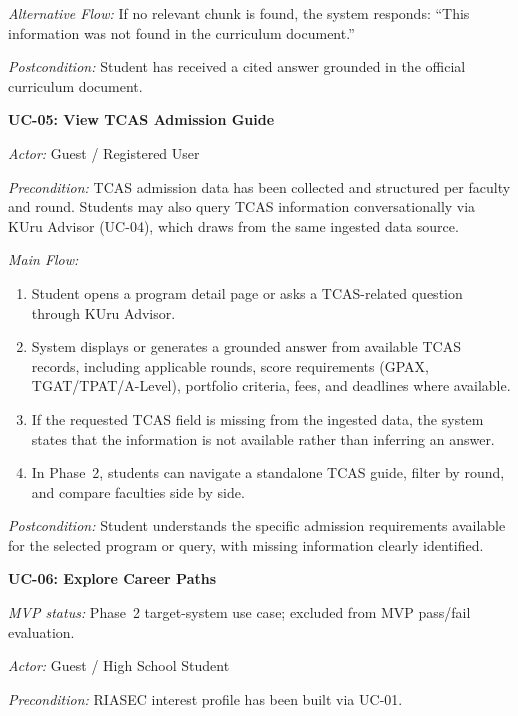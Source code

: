 \noindent\textit{Alternative Flow:} If no relevant chunk is found, the system responds: ``This information was not found in the curriculum document.''

\noindent\textit{Postcondition:} Student has received a cited answer grounded in the official curriculum document.

\vspace{1ex}
\noindent\textbf{UC-05: View TCAS Admission Guide}

\noindent\textit{Actor:} Guest / Registered User

\noindent\textit{Precondition:} TCAS admission data has been collected and structured per faculty and round. Students may also query TCAS information conversationally via KUru Advisor (UC-04), which draws from the same ingested data source.

\noindent\textit{Main Flow:}
\begin{enumerate}[leftmargin=80pt]
    \item Student opens a program detail page or asks a TCAS-related question through KUru Advisor.
    \item System displays or generates a grounded answer from available TCAS records, including applicable rounds, score requirements (GPAX, TGAT/TPAT/A-Level), portfolio criteria, fees, and deadlines where available.
    \item If the requested TCAS field is missing from the ingested data, the system states that the information is not available rather than inferring an answer.
    \item In Phase~2, students can navigate a standalone TCAS guide, filter by round, and compare faculties side by side.
\end{enumerate}

\noindent\textit{Postcondition:} Student understands the specific admission requirements available for the selected program or query, with missing information clearly identified.

\vspace{1ex}
\noindent\textbf{UC-06: Explore Career Paths}

\noindent\textit{MVP status:} Phase~2 target-system use case; excluded from MVP pass/fail evaluation.

\noindent\textit{Actor:} Guest / High School Student

\noindent\textit{Precondition:} RIASEC interest profile has been built via UC-01.


